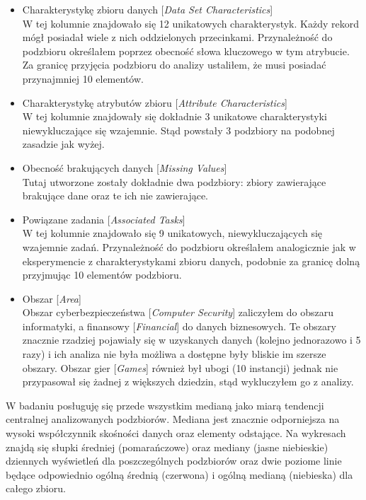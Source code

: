 \begin{itemize}
  \item Charakterystykę zbioru danych [\emph{Data Set Characteristics}] \\
        W tej kolumnie znajdowało się 12 unikatowych charakterystyk.
        Każdy rekord mógł posiadał wiele z nich oddzielonych przecinkami.
        Przynależność do podzbioru określałem poprzez obecność słowa kluczowego w tym atrybucie.
        Za granicę przyjęcia podzbioru do analizy ustaliłem, że musi posiadać przynajmniej 10 elementów.

  \item Charakterystykę atrybutów zbioru [\emph{Attribute Characteristics}] \\
        W tej kolumnie znajdowały się dokładnie 3 unikatowe charakterystyki niewykluczające się wzajemnie.
        Stąd powstały 3 podzbiory na podobnej zasadzie jak wyżej.

  \item Obecność brakujących danych [\emph{Missing Values}] \\
        Tutaj utworzone zostały dokładnie dwa podzbiory: zbiory zawierające brakujące dane oraz te ich nie zawierające.

  \item Powiązane zadania [\emph{Associated Tasks}] \\
        W tej kolumnie znajdowało się 9 unikatowych, niewykluczających się wzajemnie zadań.
        Przynależność do podzbioru określałem analogicznie jak w eksperymencie z charakterystykami zbioru danych, podobnie za granicę dolną przyjmując 10 elementów podzbioru.

  \item Obszar [\emph{Area}] \\
        Obszar cyberbezpieczeństwa [\emph{Computer Security}] zaliczyłem do obszaru informatyki, a finansowy [\emph{Financial}] do danych biznesowych.
        Te obszary znacznie rzadziej pojawiały się w uzyskanych danych (kolejno jednorazowo i 5 razy) i ich analiza nie była możliwa a dostępne były bliskie im szersze obszary.
        Obszar gier [\emph{Games}] również był ubogi (10 instancji) jednak nie przypasował się żadnej z większych dziedzin, stąd wykluczyłem go z analizy.

\end{itemize}

W badaniu posługuję się przede wszystkim medianą jako miarą tendencji centralnej analizowanych podzbiorów.
Mediana jest znacznie odporniejsza na wysoki współczynnik skośności danych oraz elementy odstające.
Na wykresach znajdą się słupki średniej (pomarańczowe) oraz mediany (jasne niebieskie) dziennych wyświetleń dla poszczególnych podzbiorów oraz dwie poziome linie będące odpowiednio ogólną średnią (czerwona) i ogólną medianą (niebieska) dla całego zbioru.


